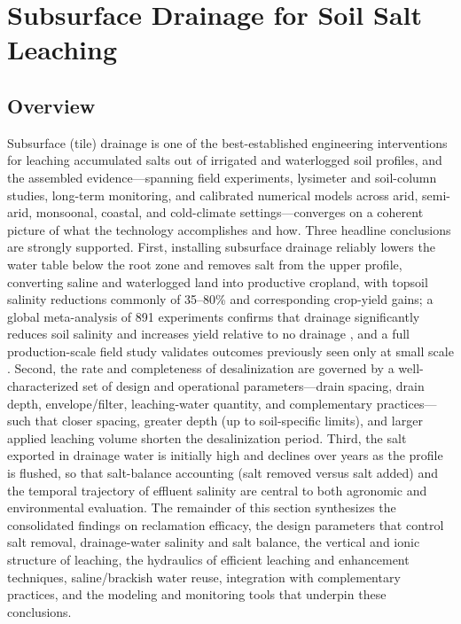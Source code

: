 \documentclass[11pt]{article}
\begin{document}
\section*{Subsurface Drainage for Soil Salt Leaching}

\subsection{Overview}

Subsurface (tile) drainage is one of the best-established engineering interventions for leaching accumulated salts out of irrigated and waterlogged soil profiles, and the assembled evidence---spanning field experiments, lysimeter and soil-column studies, long-term monitoring, and calibrated numerical models across arid, semi-arid, monsoonal, coastal, and cold-climate settings---converges on a coherent picture of what the technology accomplishes and how. Three headline conclusions are strongly supported. First, installing subsurface drainage reliably lowers the water table below the root zone and removes salt from the upper profile, converting saline and waterlogged land into productive cropland, with topsoil salinity reductions commonly of 35--80\% and corresponding crop-yield gains; a global meta-analysis of 891 experiments confirms that drainage significantly reduces soil salinity and increases yield relative to no drainage \parencite{Yang2025}, and a full production-scale field study validates outcomes previously seen only at small scale \parencite{Derby2024}. Second, the rate and completeness of desalinization are governed by a well-characterized set of design and operational parameters---drain spacing, drain depth, envelope/filter, leaching-water quantity, and complementary practices---such that closer spacing, greater depth (up to soil-specific limits), and larger applied leaching volume shorten the desalinization period. Third, the salt exported in drainage water is initially high and declines over years as the profile is flushed, so that salt-balance accounting (salt removed versus salt added) and the temporal trajectory of effluent salinity are central to both agronomic and environmental evaluation. The remainder of this section synthesizes the consolidated findings on reclamation efficacy, the design parameters that control salt removal, drainage-water salinity and salt balance, the vertical and ionic structure of leaching, the hydraulics of efficient leaching and enhancement techniques, saline/brackish water reuse, integration with complementary practices, and the modeling and monitoring tools that underpin these conclusions.
\end{document}
